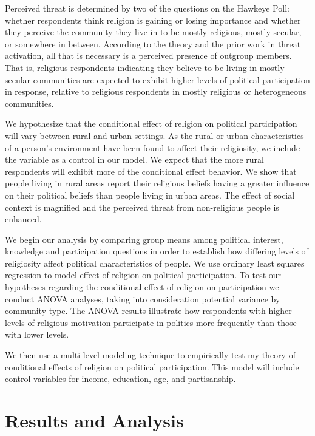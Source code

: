 \documentclass{article}
\begin{document}
Perceived threat is determined by two of the questions on the Hawkeye Poll: whether respondents think religion is gaining or losing importance and whether they perceive the community they live in to be mostly religious, mostly secular, or somewhere in between.  According to the theory and the prior work in threat activation, all that is necessary is a perceived presence of outgroup members.  That is, religious respondents indicating they believe to be living in mostly secular communities are expected to exhibit higher levels of political participation in response, relative to religious respondents in mostly religious or heterogeneous communities.

We hypothesize that the conditional effect of religion on political participation will vary between rural and urban settings.  As the rural or urban characteristics of a person's environment have been found to affect their religiosity, we include the variable as a control in our model.  We expect that the more rural respondents will exhibit more of the conditional effect behavior.  We show that people living in rural areas report their religious beliefs having a greater influence on their political beliefs than people living in urban areas.  The effect of social context is magnified and the perceived threat from non-religious people is enhanced.  

We begin our analysis by comparing group means among political interest, knowledge and participation questions in order to establish how differing levels of religiosity affect political characteristics of people.  We use ordinary least squares regression to model effect of religion on political participation.  To test our hypotheses regarding the conditional effect of religion on participation we conduct ANOVA analyses, taking into consideration potential variance by community type.  The ANOVA results illustrate how respondents with higher levels of religious motivation participate in politics more frequently than those with lower levels.  

We then use a multi-level modeling technique to empirically test my theory of conditional effects of religion on political participation.  This model will include control variables for income, education, age, and partisanship.

\section*{Results and Analysis}
\end{document}
